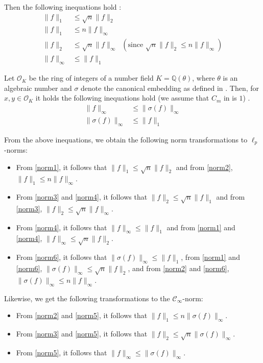 \documentclass[
  a4paper,  %
  twoside,  %
  bibliography=totoc,
  headsepline,
  cleardoublepage=empty,
  parskip=half,
  draft=false
]{scrbook}
\begin{document}
Then the following inequations hold \cite{BDLOP18}:
\begin{align}
  \| f \|_1      & \leq \sqrt{n} \| f \|_2 \label{norm1}                                                                    \\
  \| f \|_1      & \leq n \| f \|_\infty \label{norm2}                                                                      \\
  \| f \|_2      & \leq \sqrt{n} \| f \|_\infty \;\;(\text{since }  \sqrt{n} \| f \|_2 \leq n \| f \|_\infty) \label{norm3} \\
  \| f \|_\infty & \leq \| f \|_1 \label{norm4}
\end{align}

Let $\mathcal{O}_K$ be the ring of integers of a number field $K=\mathbb{Q}(\theta)$, where $\theta$ is an algebraic number and $\sigma$ denote the canonical embedding as defined in \cite{DPSZ12}. Then, for $x, y \in \mathcal{O}_K$ it holds the following inequations hold (we assume that $C_m$ in \cite{DPSZ12} is $1$) \cite{DPSZ12}.
\begin{align}
  \| f \|_\infty         & \leq \| \sigma(f) \|_\infty \label{norm5} \\
  \| \sigma(f) \|_\infty & \leq \| f \|_1 \label{norm6}
\end{align}

From the above inequations, we obtain the following norm transformations to $\ell_p$-norms:
\begin{itemize}
  \item From \cref{norm1}, it follows that $\| f \|_1 \leq \sqrt{n} \| f \|_2$ and from \cref{norm2}, $\| f \|_1 \leq n \| f \|_\infty$.
  \item From \cref{norm3} and \cref{norm4}, it follows that $\| f \|_2 \leq \sqrt{n}  \| f \|_1$ and from \cref{norm3}, $\| f \|_2 \leq \sqrt{n}  \| f \|_\infty$.
  \item From \cref{norm4}, it follows that $\| f \|_\infty \leq  \| f \|_1$ and from \cref{norm1} and \cref{norm4}, $\| f \|_\infty \leq \sqrt{n}  \| f \|_2$.
  \item From \cref{norm6}, it follows that $\| \sigma(f) \|_\infty \leq  \| f \|_1$, from \cref{norm1} and \cref{norm6}, $\| \sigma(f) \|_\infty \leq \sqrt{n}  \| f \|_2$, and from \cref{norm2} and \cref{norm6}, $\| \sigma(f) \|_\infty \leq n  \| f \|_\infty$.
\end{itemize}

Likewise, we get the following transformations to the $\mathcal{C}_\infty$-norm:
\begin{itemize}
  \item From \cref{norm2} and \cref{norm5}, it follows that $\| f \|_1 \leq  n \| \sigma(f) \|_\infty$.
  \item From \cref{norm3} and \cref{norm5}, it follows that $\| f \|_2 \leq  \sqrt{n} \| \sigma(f) \|_\infty$.
  \item From \cref{norm5}, it follows that $\| f \|_\infty \leq  \| \sigma(f) \|_\infty$.
\end{itemize}
\end{document}
